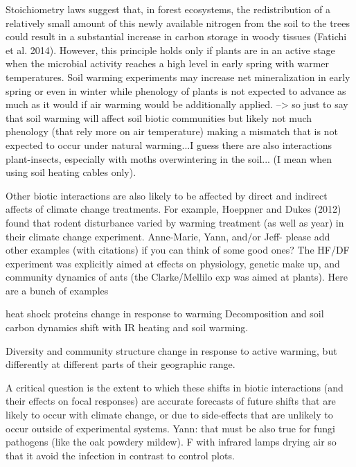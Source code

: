 \documentclass{article}
\begin{document}
Stoichiometry laws suggest that, in forest ecosystems, the redistribution of a relatively small amount of this newly available nitrogen from the soil to the trees could result in a substantial increase in carbon storage in woody tissues (Fatichi et al. 2014). However, this principle holds only if plants are in an active stage when the microbial activity reaches a high level in early spring with warmer temperatures. Soil warming experiments may increase net mineralization in early spring or even in winter while phenology of plants is not expected to advance as much as it would if air warming would be additionally applied.
--> so just to say that soil warming will affect soil biotic communities but likely not much phenology (that rely more on air temperature) making a mismatch that is not expected to occur under natural warming...I guess there are also interactions plant-insects, especially with moths overwintering in the soil... (I mean when using soil heating cables only). 

\par Other biotic interactions are also likely to be affected by direct and indirect affects of climate change treatments. For example, Hoeppner and Dukes (2012) found that rodent disturbance varied by warming treatment (as well as year) in their climate change experiment. Anne-Marie, Yann, and/or Jeff- please add other examples (with citations) if you can think of some good ones? 
The HF/DF experiment was explicitly aimed at effects on physiology, genetic make up, and community dynamics of ants (the Clarke/Mellilo exp was aimed at plants). Here are a bunch of examples

heat shock proteins change in response to warming  \citep{stanton2016}
Decomposition and soil carbon dynamics shift with IR heating and soil warming\citep{deltoro2015}. 

Diversity and community structure change in response to active warming, but differently at different parts of their geographic range. \citep{pelini2014,diamond2016}


A critical question is the extent to which these shifts in biotic interactions (and their effects on focal responses) are accurate forecasts of future shifts that are likely to occur with climate change, or due to side-effects that are unlikely to occur outside of experimental systems. \citep{diamond2013}
Yann: that must be also true for fungi pathogens (like the oak powdery mildew). F with infrared lamps drying air so that it avoid the infection in contrast to control plots.
\end{document}
